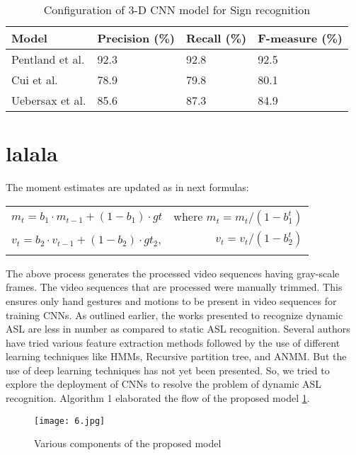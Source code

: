 \documentclass[
  manuscript=article,  %
  layout=preprint,  %
  year=20xx,
  volume=x,
]{joas}
\begin{document}
\begin{table}[!ht]
\caption{ Configuration of 3-D CNN model for Sign recognition\label{tab2}}
\begin{tabular*}{\columnwidth}{@{\extracolsep\fill}|p{3cm}|p{3cm}|p{3cm}|p{3cm}|@{\extracolsep\fill}}
\toprule
Model & Precision (\%) & Recall (\%) & F-measure (\%)\\
\midrule
Pentland et al. & 92.3 & 92.8 & 92.5\\
Cui et al. & 78.9 & 79.8 & 80.1 \\
Uebersax et al. & 85.6 &87.3 & 84.9 \\
\bottomrule
\end{tabular*}
\end{table}






\section{lalala}\label{sec6}

The moment estimates are updated as in next formulas:


\begin{tabular}{p{7cm}r}
    $m_{t}=b_{1} \cdot m_{t-1}+(1-b_{1}) \cdot gt$ & where $m_{t} = m_{t}/ \left(1-b^t_{1}\right) $ \\
    \addlinespace
    $v_{t}=b_{2} \cdot v_{t-1}+(1-b_{2}) \cdot gt_{2}$, & $v_{t} = v_{t}/ \left(1-b^t_{2}\right)$ \\
    \addlinespace
\end{tabular}



The above process generates the processed video sequences having gray-scale frames. The video sequences that are processed were manually trimmed. This ensures only hand gestures and motions to be present in video sequences for training CNNs. As outlined earlier, the works presented to recognize dynamic ASL are less in number as compared to static ASL recognition. Several authors have tried various feature extraction methods followed by the use of different learning techniques like HMMs, Recursive partition tree, and ANMM. But the use of deep learning techniques has not yet been presented. So, we tried to explore the deployment of CNNs to resolve the problem of dynamic ASL recognition. Algorithm 1 elaborated the flow of the proposed model \ref{f3}.




\begin{figure}[h!]
    \centering
    \texttt{[image: 6.jpg]}
    \caption{Various components of the proposed model}
    \label{f3}
\end{figure}
\end{document}
